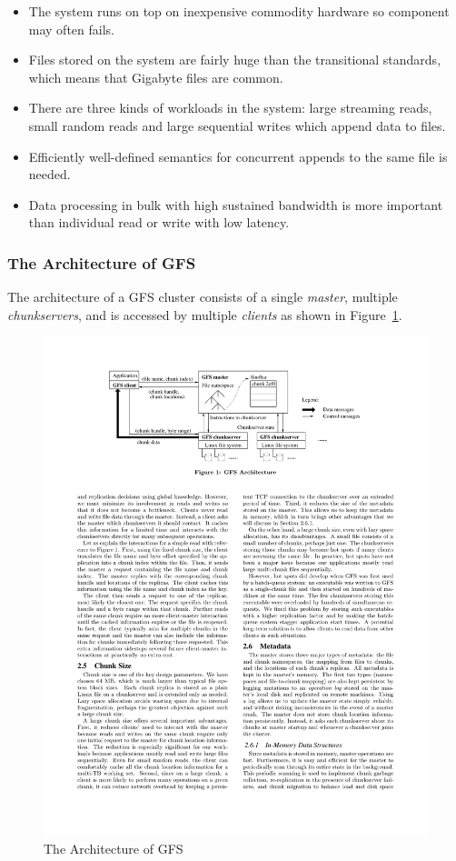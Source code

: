 \begin{itemize}[noitemsep]
	\item The system runs on top on inexpensive commodity hardware so component may often fails.
	\item Files stored on the system are fairly huge than the transitional standards, which means that Gigabyte files are common.
	\item There are three kinds of workloads in the system: large streaming reads, small random reads and large sequential writes which append data to files.
	\item Efficiently well-defined semantics for concurrent appends to the same file is needed.
	\item Data processing in bulk with high sustained bandwidth is more important than individual read or write with low latency.
\end{itemize}

\subsubsection{The Architecture of GFS}
\noindent The architecture of a GFS cluster consists of a single \textit{master}, multiple \textit{chunkservers}, and is accessed by multiple \textit{clients} as shown in Figure~\ref{fig:gfs}.

\begin{figure}[h]
	\centering
	\includegraphics[width=\linewidth]{figs/GFSArchitecture.pdf}
	\caption{The Architecture of GFS \protect \cite{ghemawat2003google}}
	\label{fig:gfs}
\end{figure}

